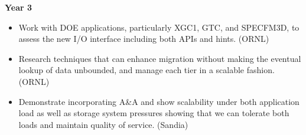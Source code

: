 \textbf{Year 3}
\begin{itemize}
\item Work with DOE applications, particularly XGC1, GTC, and SPECFM3D, to assess 
the new I/O interface including both APIs and hints. (ORNL)
\item Research techniques that can enhance migration without making the eventual 
lookup of data unbounded, and manage each tier in a scalable fashion. (ORNL)
\item Demonstrate incorporating A\&A and show scalability under both application load as
well as storage system pressures showing that we can tolerate both loads and maintain quality of
service. (Sandia)
\end{itemize}
